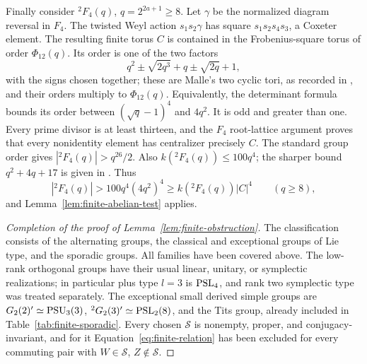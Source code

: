 Finally consider ${}^2F_4(q)$, $q=2^{2a+1}\ge8$. Let $\gamma$ be
the normalized diagram reversal in $F_4$. The twisted Weyl
action $s_1s_2\gamma$ has square $s_1s_2s_4s_3$, a Coxeter
element. The resulting finite torus $C$ is contained in the
Frobenius-square torus of order $\Phi_{12}(q)$. Its order is one
of the two factors
\[
 q^2\pm\sqrt{2q^3}+q\pm\sqrt{2q}+1,
\]
with the signs chosen together; these are Malle's two cyclic tori,
as recorded in \cite[Theorem~8]{GarionLarsenLubotzky}, and their
orders multiply to $\Phi_{12}(q)$. Equivalently, the
determinant formula bounds its order between
$(\sqrt q-1)^4$ and $4q^2$. It is odd and greater than one.
Every prime divisor is at least thirteen, and the $F_4$
root-lattice argument proves that every nonidentity element
has centralizer precisely $C$. The standard group order gives
$|{}^2F_4(q)|>q^{26}/2$. Also
$k({}^2F_4(q))\le100q^4$; the sharper bound
$q^2+4q+17$ is given in \cite[Table~1, p.~3049]{FulmanGuralnick}.
Thus
\[
 |{}^2F_4(q)|>100q^4(4q^2)^4\ge k({}^2F_4(q))|C|^4
 \qquad(q\ge8),
\]
and Lemma~\ref{lem:finite-abelian-test} applies.

\begin{proof}[Completion of the proof of Lemma~\ref{lem:finite-obstruction}]
The classification consists of the alternating groups, the classical
and exceptional groups of Lie type, and the sporadic groups. All
families have been covered above. The low-rank orthogonal groups
have their usual linear, unitary, or symplectic realizations;
in particular plus type $l=3$ is $\operatorname{PSL}_4$, and rank two symplectic
type was treated separately. The exceptional small derived simple
groups are $G_2(2)'\simeq\operatorname{PSU}_3(3)$,
${}^2G_2(3)'\simeq\operatorname{PSL}_2(8)$, and the Tits group, already included
in Table~\ref{tab:finite-sporadic}. Every chosen $\mathcal S$ is
nonempty, proper, and conjugacy-invariant, and for it
Equation~\eqref{eq:finite-relation} has been excluded for every
commuting pair with $W\in\mathcal S$, $Z\notin\mathcal S$.
\end{proof}
